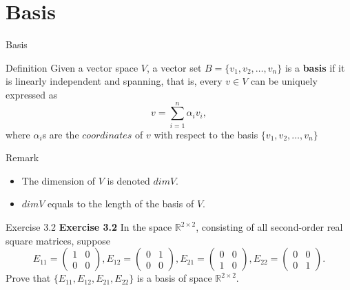 \documentclass[aspectratio=169, UTF8]{ctexbeamer}
\begin{document}
\section{Basis}
\begin{frame}[label=2]{Basis}
        \begin{block}{Definition}
        Given a vector space $V$, a vector set $B=\{v_1,v_2,\dots, v_n\}$ is a \textbf{basis} if it is linearly independent and spanning, that is, every $v\in V$ can be uniquely expressed as 
        \begin{equation*}
            v=\sum_{i=1}^n\alpha_iv_i,
        \end{equation*}
        where $\alpha_i$s are the $coordinates$ of $v$ with respect to the basis $\{v_1,v_2,\dots, v_n\}$
        \end{block}

        \begin{block}{Remark}
            \begin{itemize}
                \item The dimension of $V$ is denoted $dim V$.
                \item $dim V$ equals to the length of the basis of $V$.
            \end{itemize}
        \end{block}
\end{frame}

\begin{frame}{Exercise 3.2}
    \textbf{Exercise 3.2} In the space $\mathbb{R}^{2\times2}$, consisting of all second-order real square matrices, suppose
    \begin{equation*}
        E_{11}=\begin{pmatrix}
            1&0\\0&0
        \end{pmatrix},
        E_{12}=\begin{pmatrix}
            0&1\\0&0
        \end{pmatrix},
        E_{21}=\begin{pmatrix}
            0&0\\1&0
        \end{pmatrix},
        E_{22}=\begin{pmatrix}
            0&0\\0&1
        \end{pmatrix}.
    \end{equation*}
    Prove that $\{E_{11},E_{12},E_{21},E_{22}\}$ is a basis of space $\mathbb{R}^{2\times2}$.
\end{frame}
\end{document}
